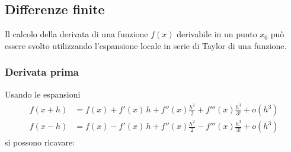 \documentclass[letterpaper,10pt,english]{jupyterBook}
\begin{document}
\subsection{Differenze finite}
\label{\detokenize{ch/numerics/derivatives:differenze-finite}}
\sphinxAtStartPar
Il calcolo della derivata di una funzione \(f(x)\) derivabile in un punto \(x_0\) può essere svolto utilizzando l’espansione locale in serie di Taylor di una funzione.


\subsubsection{Derivata prima}
\label{\detokenize{ch/numerics/derivatives:derivata-prima}}
\sphinxAtStartPar
Usando le espansioni
\begin{equation*}
\begin{split}\begin{aligned}
  f(x + h) & = f(x) + f'(x) \, h + f''(x) \frac{h^2}{2} + f'''(x) \frac{h^3}{3!} + o(h^3) \\
  f(x - h) & = f(x) - f'(x) \, h + f''(x) \frac{h^2}{2} - f'''(x) \frac{h^3}{3!} + o(h^3)
\end{aligned}\end{split}
\end{equation*}
\sphinxAtStartPar
si possono ricavare:
\end{document}
